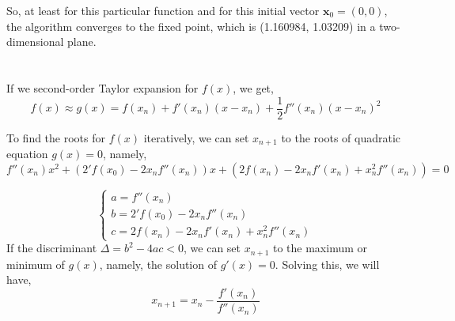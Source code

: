 \documentclass{article}
\begin{document}
So, at least for this particular function and for this initial vector
$\mathbf{x}_0 = (0,0)$, the algorithm converges to the fixed point, which is
(1.160984, 1.03209) in a two-dimensional plane.
\section{}
If we second-order Taylor expansion for $f(x)$, we get,
\[
f(x) \approx g(x) = f(x_n) + f'(x_n) (x-x_n) + \frac{1}{2} f''(x_n) (x- x_n)^2
\]

To find the roots for $f(x)$ iteratively, we can set $x_{n+1}$ to the roots of quadratic equation $g(x) = 0$, namely,
\[
f''(x_n) x^2 + (2'f(x_0) - 2 x_n f''(x_n)) x + (2f(x_n) - 2x_n f'(x_n) + x_n^2 f''(x_n)) = 0
\]

\[
\begin{cases}
    a = f''(x_n) \\
    b = 2'f(x_0) - 2 x_n f''(x_n) \\
    c = 2f(x_n) - 2x_n f'(x_n) + x_n^2 f''(x_n)
\end{cases}
\]
If the discriminant $\Delta = b^2 - 4ac < 0$, we can set $x_{n+1}$ to the maximum or minimum of $g(x)$, namely, the solution of $g'(x) = 0$. Solving this, we will have,
\[
x_{n+1} = x_n - \frac{f'(x_n)}{f''(x_n)}
\]
\end{document}
